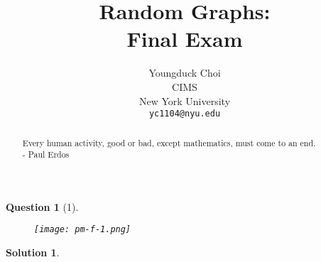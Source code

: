 \documentclass{article} %
\title{Random Graphs: \\
Final Exam}
\author{
Youngduck Choi \\
CIMS \\
New York University\\
\texttt{yc1104@nyu.edu} \\
}
\theoremstyle{quest}
\newtheorem*{question}{Question}
\newtheorem*{solution}{Solution}
\begin{document}
\maketitle

\begin{abstract}
Every human activity, good or bad, except mathematics, must come to an end. \\
- Paul Erdos
\end{abstract}

\bigskip

\begin{question}[1]
\hfill
\begin{figure}[h!]
  \centering
    \texttt{[image: pm-f-1.png]}
\end{figure}
\end{question}
\begin{solution} \hfill \\

\end{solution}

\newpage
\end{document}
